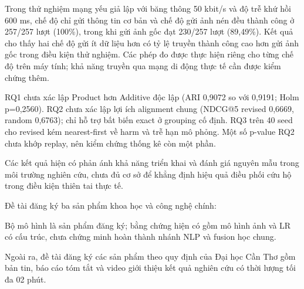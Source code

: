 Trong thử nghiệm mạng yếu giả lập với băng thông 50 kbit/s và độ trễ khứ hồi 600 ms, chế độ chỉ gửi thông tin cơ bản và chế độ gửi ảnh nén đều thành công ở 257/257 lượt (100\%), trong khi gửi ảnh gốc đạt 230/257 lượt (89,49\%). Kết quả cho thấy hai chế độ gửi ít dữ liệu hơn có tỷ lệ truyền thành công cao hơn gửi ảnh gốc trong điều kiện thử nghiệm. Các phép đo được thực hiện riêng cho từng chế độ trên máy tính; khả năng truyền qua mạng di động thực tế cần được kiểm chứng thêm.

RQ1 chưa xác lập Product hơn Additive độc lập (ARI 0,9072 so với 0,9191; Holm p=0,2560). RQ2 chưa xác lập lợi ích alignment chung (NDCG@5 revised 0,6669, random 0,6763); chỉ hỗ trợ bất biến exact ở grouping cố định. RQ3 trên 40 seed cho revised kém nearest-first về harm và trễ hạn mô phỏng. Một số p-value RQ2 chưa khớp replay, nên kiểm chứng thống kê còn một phần.

Các kết quả hiện có phản ánh khả năng triển khai và đánh giá nguyên mẫu trong môi trường nghiên cứu, chưa đủ cơ sở để khẳng định hiệu quả điều phối cứu hộ trong điều kiện thiên tai thực tế.

Đề tài đăng ký ba sản phẩm khoa học và công nghệ chính:
\par\noindent Bộ mô hình là sản phẩm đăng ký; bằng chứng hiện có gồm mô hình ảnh và LR có cấu trúc, chưa chứng minh hoàn thành nhánh NLP và fusion học chung.
\par\noindent Ngoài ra, đề tài đăng ký các sản phẩm theo quy định của Đại học Cần Thơ gồm bản tin, báo cáo tóm tắt và video giới thiệu kết quả nghiên cứu có thời lượng tối đa 02 phút.

